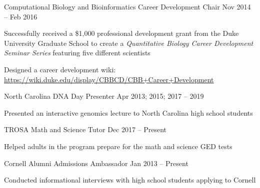 

\begin{resentries}

  \leadershipentry
    {Computational Biology and Bioinformatics Career Development Chair} %
    {Nov 2014 -- Feb 2016} %
     {
		\begin{cvitems} %
			\item{Successfully received a \$1,000 professional development grant from the Duke University Graduate School to create a \textit{Quantitative Biology Career Development Seminar Series} featuring five different scientists}
        	\item{Designed a career development wiki: \href{https://wiki.duke.edu/display/CBBCD/CBB+Career+Development}{\color{blue} https://wiki.duke.edu/display/CBBCD/CBB+Career+Development}}
		\end{cvitems}
	 }

  \leadershipentry
    {North Carolina DNA Day Presenter}
    {Apr 2013; 2015; 2017 -- 2019} %
     {
		\begin{cvitems} %
			\item{Presented an interactive genomics lecture to North Carolina high school students}
		\end{cvitems}
	 }

  \leadershipentry
    {TROSA Math and Science Tutor}
    {Dec 2017 -- Present} %
     {
		\begin{cvitems} %
			\item{Helped adults in the program prepare for the math and science GED tests}
		\end{cvitems}
	 }

  \leadershipentry
    {Cornell Alumni Admissions Ambassador}
    {Jan 2013 -- Present} %
     {
		\begin{cvitems} %
			\item{Conducted informational interviews with high school students applying to Cornell}
		\end{cvitems}
	 }



\end{resentries}
